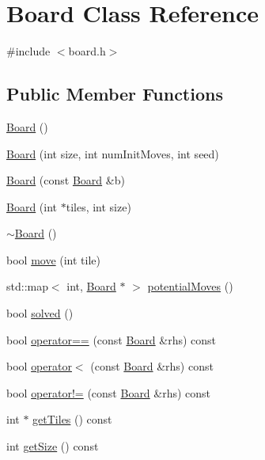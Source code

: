 \hypertarget{classBoard}{\section{\-Board \-Class \-Reference}
\label{classBoard}
}


{\ttfamily \#include $<$board.\-h$>$}

\subsection*{\-Public \-Member \-Functions}
\begin{DoxyCompactItemize}
\item 
\hyperlink{classBoard_a9ee491d4fea680cf69b033374a9fdfcb}{\-Board} ()
\item 
\hyperlink{classBoard_a434d72861e7cee4ddbff4975d4522ff0}{\-Board} (int size, int num\-Init\-Moves, int seed)
\item 
\hyperlink{classBoard_ac77f209904bb37545295c17649a9dc17}{\-Board} (const \hyperlink{classBoard}{\-Board} \&b)
\item 
\hyperlink{classBoard_a97919e1594a034a83d6b18a6dd1c8b47}{\-Board} (int $\ast$tiles, int size)
\item 
\hyperlink{classBoard_af73f45730119a1fd8f6670f53f959e68}{$\sim$\-Board} ()
\item 
bool \hyperlink{classBoard_a4a7bb4b1d1e25cc5cfcce4a0f6a5c68b}{move} (int tile)
\item 
std\-::map$<$ int, \hyperlink{classBoard}{\-Board} $\ast$ $>$ \hyperlink{classBoard_a69149b8091bfaf02a394bedb9ff5f57f}{potential\-Moves} ()
\item 
bool \hyperlink{classBoard_aa2170b9bd685aae34f2c285add6da859}{solved} ()
\item 
bool \hyperlink{classBoard_acfdb9fa0c980de10be68aa082f31bda5}{operator==} (const \hyperlink{classBoard}{\-Board} \&rhs) const 
\item 
bool \hyperlink{classBoard_a162027718b714192d52f8d3aa71359c3}{operator$<$} (const \hyperlink{classBoard}{\-Board} \&rhs) const 
\item 
bool \hyperlink{classBoard_a2724182ffc7179d2eee30d55baa64923}{operator!=} (const \hyperlink{classBoard}{\-Board} \&rhs) const 
\item 
int $\ast$ \hyperlink{classBoard_aa884ede047e11f0dc2ec8d5b1aa9be46}{get\-Tiles} () const 
\item 
int \hyperlink{classBoard_a65a9e00ec8f504699ca6226f78516a1e}{get\-Size} () const 
\end{DoxyCompactItemize}
